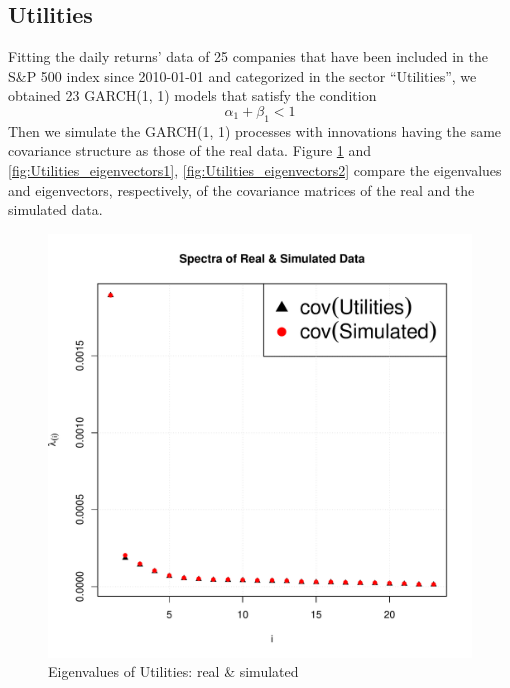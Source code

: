 \documentclass{article}
\begin{document}
\subsection{Utilities}
Fitting the daily returns' data of 25 companies that have been
included in the S\&P 500 index since 2010-01-01 and categorized in the
sector ``Utilities'', we obtained 23 GARCH(1, 1) models that satisfy
the condition
\begin{equation}
  \label{eq:garch_cond1}
  \alpha_1 + \beta_1 < 1  
\end{equation}
Then we simulate the GARCH(1, 1) processes with innovations having the
same covariance structure as those of the real data. Figure
\ref{fig:Utilities_eigenvalues} and \ref{fig:Utilities_eigenvectors1},
\ref{fig:Utilities_eigenvectors2}
compare the eigenvalues and eigenvectors, respectively, of the 
covariance matrices of the real and the simulated data.
\begin{figure}[htb!]
  \centering
  \includegraphics[scale=0.4]{Utilities_eigenvalues.pdf}
  \caption{Eigenvalues of Utilities: real \& simulated}
  \label{fig:Utilities_eigenvalues}
\end{figure}
\end{document}
